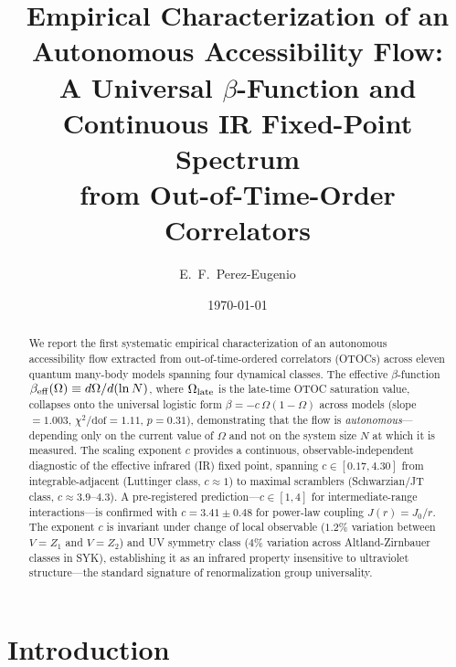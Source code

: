 \documentclass[aps,prl,twocolumn,showpacs,preprintnumbers,superscriptaddress]{revtex4-2}
\begin{document}
\title{Empirical Characterization of an Autonomous Accessibility Flow:\\
A Universal $\beta$-Function and Continuous IR Fixed-Point Spectrum\\
from Out-of-Time-Order Correlators}

\author{E.~F.~Perez-Eugenio}

\date{\today}

\begin{abstract}
We report the first systematic empirical characterization of an autonomous
accessibility flow extracted from out-of-time-ordered correlators (OTOCs)
across eleven quantum many-body models spanning four dynamical classes.
The effective $\beta$-function $\beta_{\rm eff}(\Omega) \equiv
d\Omega/d(\ln N)$, where $\Omega_{\rm late}$ is the late-time OTOC
saturation value, collapses onto the universal logistic form
$\beta = -c\,\Omega(1-\Omega)$ across models
(slope $= 1.003$, $\chi^2/\text{dof} = 1.11$, $p = 0.31$),
demonstrating that the flow is \emph{autonomous}---depending only on the
current value of $\Omega$ and not on the system size $N$ at which it is
measured.
The scaling exponent $c$ provides a continuous, observable-independent
diagnostic of the effective infrared (IR) fixed point, spanning
$c \in [0.17, 4.30]$ from integrable-adjacent (Luttinger class, $c \approx
1$) to maximal scramblers (Schwarzian/JT class, $c \approx 3.9$--$4.3$).
A pre-registered prediction---$c \in [1, 4]$ for intermediate-range
interactions---is confirmed with $c = 3.41 \pm 0.48$ for power-law coupling
$J(r) = J_0/r$.
The exponent $c$ is invariant under change of local observable ($1.2\%$
variation between $V = Z_1$ and $V = Z_2$) and UV symmetry class ($4\%$
variation across Altland-Zirnbauer classes in SYK), establishing it as an
infrared property insensitive to ultraviolet structure---the standard
signature of renormalization group universality.
\end{abstract}

\maketitle

\section{Introduction}
\label{sec:intro}
\end{document}
